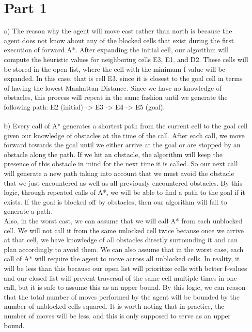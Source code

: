 \documentclass[12pt, letterpaper]{article}
\begin{document}
\section*{Part 1}
a) The reason why the agent will move east rather than north is because the agent does not know about any of the blocked cells that exist during the first execution of forward A*. After expanding the initial cell, our algorithm will compute the heuristic values for neighboring cells E3, E1, and D2. These cells will be stored in the open list, where the cell with the minimum f-value will be expanded. In this case, that is cell E3, since it is closest to the goal cell in terms of having the lowest Manhattan Distance. Since we have no knowledge of obstacles, this process will repeat in the same fashion until we generate the following path: E2 (initial) -> E3 -> E4 -> E5 (goal). 
\\\\
b) Every call of A* generates a shortest path from the current cell to the goal cell given our knowledge of obstacles at the time of the call. After each call, we move forward towards the goal until we either arrive at the goal or are stopped by an obstacle along the path. If we hit an obstacle, the algorithm will keep the presence of this obstacle in mind for the next time it is called. So our next call will generate a new path taking into account that we must avoid the obstacle that we just encountered as well as all previously encountered obstacles. By this logic, through repeated calls of A*, we will be able to find a path to the goal if it exists. If the goal is blocked off by obstacles, then our algorithm will fail to generate a path.
\\
Also, in the worst cast, we can assume that we will call A* from each unblocked cell. We will not call it from the same unlocked cell twice because once we arrive at that cell, we have knowledge of all obstacles directly surrounding it and can plan accordingly to avoid them. We can also assume that in the worst case, each call of A* will require the agent to move across all unblocked cells. In reality, it will be less than this because our open list will prioritize cells with better f-values and our closed list will prevent traversal of the same cell multiple times in one call, but it is safe to assume this as an upper bound. By this logic, we can reason that the total number of moves performed by the agent will be bounded by the number of unblocked cells squared. It is worth noting that in practice, the number of moves will be less, and this is only supposed to serve as an upper bound. 
\pagebreak
\end{document}
